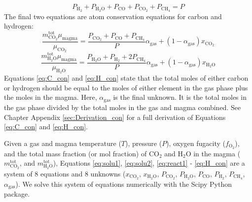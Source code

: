 \begin{equation}\label{eq:pres}
    {P_{{{\text{H}}_{\text{2}}}}} + {P_{{{\text{H}}_{\text{2}}}{\text{O}}}} + {P_{{\text{CO}}}} + {P_{{\text{C}}{{\text{O}}_{\text{2}}}}} + {P_{{\text{C}}{{\text{H}}_{\text{4}}}}} = P
\end{equation}
The final two equations are atom conservation equations for carbon and hydrogen:
\begin{equation}\label{eq:C_con}
    {\frac{{m_{{\text{C}}{{\text{O}}_{\text{2}}}}^{{\text{tot}}}}\mu_\mathrm{magma}}{{{\mu_{{\text{C}}{{\text{O}}_{\text{2}}}}}}}} = \frac{{{P_{{\text{C}}{{\text{O}}_{\text{2}}}}} + {P_{{\text{CO}}}} + {P_{{\text{C}}{{\text{H}}_{\text{4}}}}}}}{P}{\alpha _{{\text{gas}}}} + (1 - {\alpha _{{\text{gas}}}}){x_{{\text{C}}{{\text{O}}_{\text{2}}}}}
\end{equation}
\begin{equation}\label{eq:H_con}
    {\frac{{m_{{{\text{H}}_{\text{2}}}{\text{O}}}^{{\text{tot}}}}\mu_\mathrm{magma}}{{{\mu_{{{\text{H}}_2}{\text{O}}}}}}} = \frac{{{P_{{{\text{H}}_{\text{2}}}{\text{O}}}} + {P_{{{\text{H}}_{\text{2}}}}} + 2{P_{{\text{C}}{{\text{H}}_{\text{4}}}}}}}{P}{\alpha _{{\text{gas}}}} + (1 - {\alpha _{{\text{gas}}}}){x_{{{\text{H}}_{\text{2}}}{\text{O}}}}
\end{equation}
Equations \eqref{eq:C_con} and \eqref{eq:H_con} state that the total moles of either carbon or hydrogen should be equal to the moles of either element in the gas phase plus the moles in the magma. Here, $\alpha_\mathrm{gas}$ is the final unknown. It is the total moles in the gas phase divided by the total moles in the gas and magma combined. See Chapter Appendix \ref{sec:Derivation_con} for a full derivation of Equations \eqref{eq:C_con} and \eqref{eq:H_con}.

Given a gas and magma temperature ($T$), pressure ($P$),  oxygen fugacity ($f_{\mathrm{O_2}}$), and the total mass fraction (or mol fraction) of CO$_2$ and H$_2$O in the magma ($m_\mathrm{CO_2}^{\mathrm{tot}}$, and $m_\mathrm{H_2O}^{\mathrm{tot}}$), Equations \eqref{eq:solu1}, \eqref{eq:solu2}, \eqref{eq:react1} - \eqref{eq:H_con} are a system of 8 equations and 8 unknowns ($x_{\mathrm{CO_2}}$, $x_{\mathrm{H_2O}}$, $P_{\mathrm{CO_2}}$, $P_{\mathrm{H_2O}}$, $P_{\mathrm{CO}}$, $P_{\mathrm{H_2}}$, $P_{\mathrm{CH_4}}$,$\alpha_\mathrm{gas}$). We solve this system of equations numerically with the Scipy Python package.

